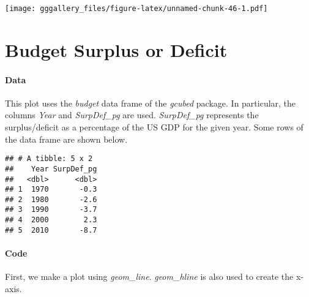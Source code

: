 \documentclass[]{book}
\newenvironment{Shaded}{\begin{snugshade}}{\end{snugshade}}
\newcommand{\DecValTok}[1]{\textcolor[rgb]{0.00,0.00,0.81}{#1}}
\newcommand{\KeywordTok}[1]{\textcolor[rgb]{0.13,0.29,0.53}{\textbf{#1}}}
\newcommand{\NormalTok}[1]{#1}
\newcommand{\OperatorTok}[1]{\textcolor[rgb]{0.81,0.36,0.00}{\textbf{#1}}}
\newcommand{\StringTok}[1]{\textcolor[rgb]{0.31,0.60,0.02}{#1}}
\begin{document}
\texttt{[image: gggallery\_files/figure-latex/unnamed-chunk-46-1.pdf]}

\hypertarget{budget}{%
\chapter*{Budget Surplus or Deficit}\label{budget}}

\hypertarget{budgetdata}{%
\subsubsection*{Data}\label{budgetdata}}

This plot uses the \emph{budget} data frame of the \emph{gcubed} package. In particular, the columns \emph{Year} and \emph{SurpDef\_pg} are used. \emph{SurpDef\_pg} represents the surplus/deficit as a percentage of the US GDP for the given year. Some rows of the data frame are shown below.

\begin{Shaded}
\end{Shaded}

\begin{verbatim}
## # A tibble: 5 x 2
##    Year SurpDef_pg
##   <dbl>      <dbl>
## 1  1970       -0.3
## 2  1980       -2.6
## 3  1990       -3.7
## 4  2000        2.3
## 5  2010       -8.7
\end{verbatim}

\hypertarget{budgetcode}{%
\subsubsection*{Code}\label{budgetcode}}

First, we make a plot using \emph{geom\_line}. \emph{geom\_hline} is also used to create the x-axis.
\end{document}

